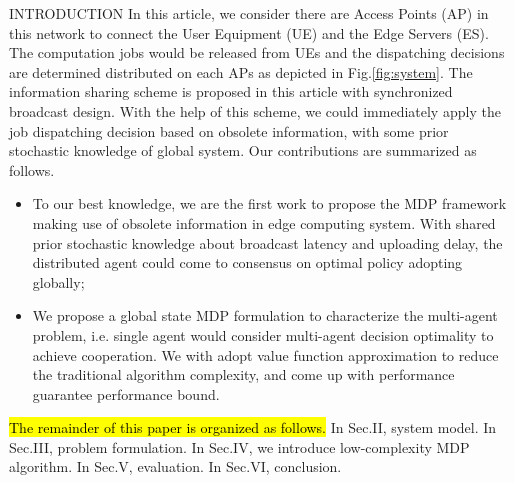 \documentclass[10pt, conference, letterpaper]{IEEEtran}
\begin{document}
\begin{section}{INTRODUCTION}
        In this article, we consider there are Access Points (AP) in this network to connect the User Equipment (UE) and the Edge Servers (ES).
        The computation jobs would be released from UEs and the dispatching decisions are determined distributed on each APs as depicted in Fig.\ref{fig:system}.
        The information sharing scheme is proposed in this article with synchronized broadcast design. With the help of this scheme, we could immediately apply the job dispatching decision based on obsolete information, with some prior stochastic knowledge of global system.
        Our contributions are summarized as follows.
        \begin{itemize}
            \item To our best knowledge, we are the first work to propose the MDP framework making use of obsolete information in edge computing system. With shared prior stochastic knowledge about broadcast latency and uploading delay, the distributed agent could come to consensus on optimal policy adopting globally;
            \item We propose a global state MDP formulation to characterize the multi-agent problem, i.e. single agent would consider multi-agent decision optimality to achieve cooperation.
            We with adopt value function approximation to reduce the traditional algorithm complexity, and come up with performance guarantee performance bound.
        \end{itemize}

        \hl{The remainder of this paper is organized as follows.}
        In Sec.II, system model.
        In Sec.III, problem formulation.
        In Sec.IV, we introduce low-complexity MDP algorithm.
        In Sec.V, evaluation.
        In Sec.VI, conclusion.
    \end{section}
\end{document}
